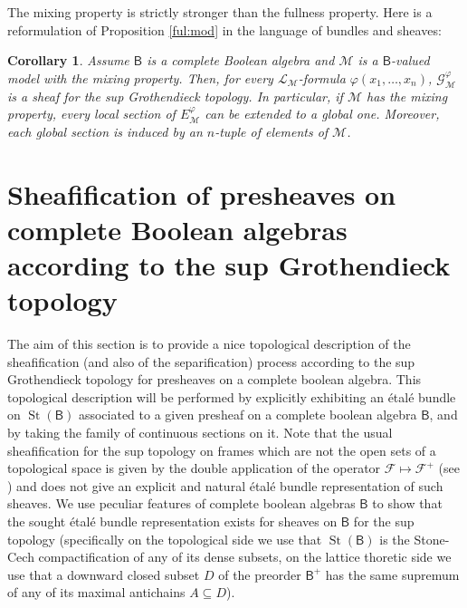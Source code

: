 \documentclass[11pt]{amsart}
\newcommand{\nphi}{\varphi}
\newcommand{\LL}{\mathcal{L}}
\newcommand{\F}{\mathcal{F}}
\newcommand{\G}{\mathcal{G}}
\theoremstyle{plain}
\newtheorem{corollary}[theorem]{Corollary}
\theoremstyle{definition}
\theoremstyle{plain}
\theoremstyle{remark}
\newcommand{\M}{\mathcal{M}}
\DeclareMathOperator{\St}{St}
\newcommand{\bool}[1]{\mathsf{#1}}
\newcommand{\0}{\mathsf{0}}
\renewcommand{\1}{\mathsf{1}}
\renewcommand{\2}{\mathsf{2}}
\theoremstyle{definition}
\begin{document}
The mixing property is strictly stronger than the fullness property. Here is a reformulation of Proposition \ref{ful:mod} in the language of bundles and sheaves:
\begin{corollary}
Assume $\bool{B}$ is a complete Boolean algebra and $\M$ is a $\bool{B}$-valued model with the mixing property. 
Then, for every $\LL_\M$-formula $\nphi(x_1, \dots, x_n)$, $\G^\nphi_\M$ is a sheaf for the sup Grothendieck topology. 
In particular, if $\M$ has the mixing property, every local section of $E^\nphi_\M$ can be extended to a global one. Moreover, each global section is induced by an $n$-tuple of elements of $\M$.
\end{corollary}



\section{Sheafification of presheaves on complete Boolean algebras according to the sup Grothendieck topology}
\label{sec:sheafposet}


The aim of this section is to provide a nice topological description of the sheafification (and also of the separification) process according to the sup Grothendieck topology for presheaves on a complete boolean algebra. This topological description will be performed by explicitly exhibiting an \'etal\'e bundle on $\St(\bool{B})$ associated to a given presheaf on a complete boolean algebra $\bool{B}$, and by taking the family of continuous sections on it. Note that the usual sheafification for the sup topology on frames which are not the open sets of a topological space is given by the double application of the operator $\F\mapsto\F^+$ (see \cite[Chapter III]{MacLMoer}) and does not give an explicit and natural \'etal\'e bundle representation of such sheaves. We use peculiar features of complete boolean algebras $\bool{B}$ to show that the sought \'etal\'e bundle representation exists for sheaves on $\bool{B}$ for the sup topology (specifically on the topological side we use that $\St(\bool{B})$ is the Stone-Cech compactification of any of its dense subsets, on the lattice thoretic side we use that a downward closed subset $D$ of the preorder $\bool{B}^+$ has the same supremum of any of its maximal antichains $A\subseteq D$).

\end{document}
